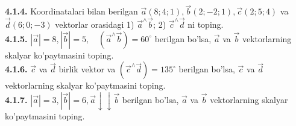 \documentclass[10pt]{article}
\begin{document}
\textbf{4.1.4.} Koordinatalari bilan berilgan $\vec{a}(8 ; 4 ; 1), \vec{b}(2 ;-2 ; 1), \vec{c}(2 ; 5 ; 4)$ va $\vec{d}(6 ; 0 ;-3)$ vektorlar orasidagi
  1) $\vec{a}^{\wedge} \vec{b}$; 2) $\vec{c}^{\wedge} \vec{d}$ ni toping.\\
\textbf{4.1.5.} $|\vec{a}|=8,|\vec{b}|=5, \quad\left(\vec{a}^{\wedge} \vec{b}\right)=60^{\circ}$ berilgan bo'lsa, $\vec{a}$ va $\vec{b}$ vektorlarning skalyar ko'paytmasini toping.\\
\textbf{4.1.6.} $\vec{c}$ va $\vec{d}$ birlik vektor va $\left(\vec{c}^{\wedge} \vec{d}\right)=135^{\circ}$ berilgan bo'lsa, $\vec{c}$ va $\vec{d}$ vektorlarning skalyar ko'paytmasini toping.\\
\textbf{4.1.7.} $|\vec{a}|=3,|\vec{b}|=6, \vec{a} \downarrow \downarrow \vec{b}$ berilgan bo'lsa, $\vec{a}$ va $\vec{b}$ vektorlarning skalyar ko'paytmasini toping.
\end{document}

